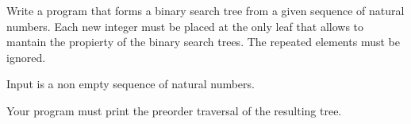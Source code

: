 


\Statement

Write a program that forms a binary search tree
from a given sequence of natural numbers.
Each new integer must be placed at the only leaf
that allows to mantain the propierty of the binary search trees.
The repeated elements must be ignored.


\Input

Input is a non empty sequence of natural numbers.


\Output

Your program must print the preorder traversal of the resulting tree.



\SampleOneCol
